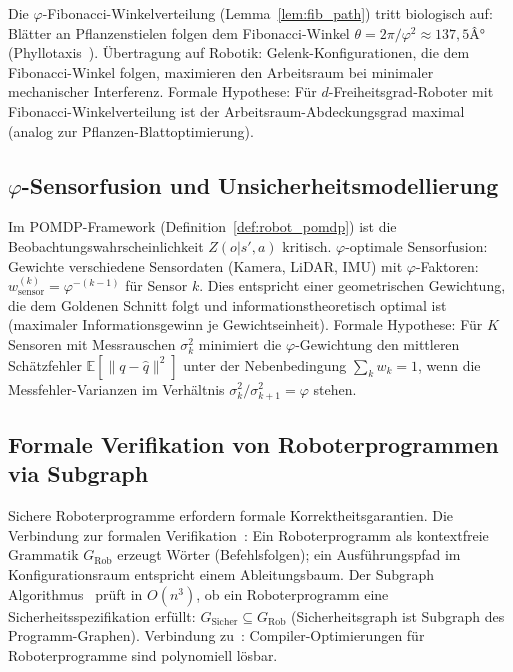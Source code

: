 ﻿\documentclass[a4paper,12pt]{article}
\theoremstyle{definition}
\begin{document}
Die $\varphi$-Fibonacci-Winkelverteilung (Lemma~\ref{lem:fib_path})
tritt biologisch auf: Bl\"atter an Pflanzenstielen folgen dem
Fibonacci-Winkel $\theta = 2\pi/\varphi^2 \approx 137{,}5Â°$ (Phyllotaxis~\cite{epp2026expl}).
\"Ubertragung auf Robotik: Gelenk-Konfigurationen, die dem Fibonacci-Winkel
folgen, maximieren den Arbeitsraum bei minimaler mechanischer Interferenz.
Formale Hypothese: F\"ur $d$-Freiheitsgrad-Roboter mit Fibonacci-Winkelverteilung
ist der Arbeitsraum-Abdeckungsgrad maximal (analog zur Pflanzen-Blattoptimierung).

\subsection{$\varphi$-Sensorfusion und Unsicherheitsmodellierung}

Im POMDP-Framework (Definition~\ref{def:robot_pomdp}) ist die
Beobachtungswahrscheinlichkeit $Z(o|s',a)$ kritisch.
$\varphi$-optimale Sensorfusion: Gewichte verschiedene Sensordaten
(Kamera, LiDAR, IMU) mit $\varphi$-Faktoren:
$w_{\mathrm{sensor}}^{(k)} = \varphi^{-(k-1)}$ f\"ur Sensor $k$.
Dies entspricht einer geometrischen Gewichtung, die dem
Goldenen Schnitt folgt und informationstheoretisch optimal ist
(maximaler Informationsgewinn je Gewichtseinheit).
Formale Hypothese: F\"ur $K$ Sensoren mit Messrauschen $\sigma_k^2$
minimiert die $\varphi$-Gewichtung den mittleren Sch\"atzfehler
$\mathbb{E}[\|q - \hat{q}\|^2]$ unter der Nebenbedingung
$\sum_k w_k = 1$, wenn die Messfehler-Varianzen im Verh\"altnis
$\sigma_k^2 / \sigma_{k+1}^2 = \varphi$ stehen.

\subsection{Formale Verifikation von Roboterprogrammen via Subgraph}

Sichere Roboterprogramme erfordern formale Korrektheitsgarantien.
Die Verbindung zur formalen Verifikation~\cite{epp2026grammatik}:
Ein Roboterprogramm als kontextfreie Grammatik $G_{\mathrm{Rob}}$
erzeugt W\"orter (Befehlsfolgen); ein Ausf\"uhrungspfad im
Konfigurationsraum entspricht einem Ableitungsbaum.
Der Subgraph Algorithmus~\cite{epp2026subgraph} pr\"uft in $O(n^3)$,
ob ein Roboterprogramm eine Sicherheitsspezifikation erf\"ullt:
$G_{\mathrm{Sicher}} \subseteq G_{\mathrm{Rob}}$ (Sicherheitsgraph ist
Subgraph des Programm-Graphen).
Verbindung zu~\cite{epp2026ccl}: Compiler-Optimierungen f\"ur
Roboterprogramme sind polynomiell l\"osbar.
\end{document}
